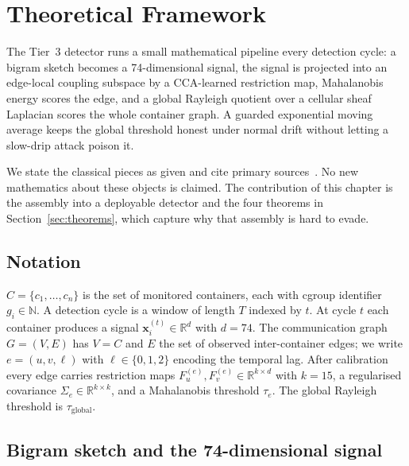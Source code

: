 \chapter{Theoretical Framework}
\label{Chapter3}

The Tier~3 detector runs a small mathematical pipeline every detection
cycle: a bigram sketch becomes a 74-dimensional signal, the signal is
projected into an edge-local coupling subspace by a CCA-learned restriction
map, Mahalanobis energy scores the edge, and a global Rayleigh quotient
over a cellular sheaf Laplacian scores the whole container graph. A guarded
exponential moving average keeps the global threshold honest under normal
drift without letting a slow-drip attack poison it.

We state the classical pieces as given and cite primary
sources~\cite{hotelling1936,mahalanobis1936,hansen2019spectral,curry2014sheaves,robinson2014topological,chung1997spectral}.
No new mathematics about these objects is claimed. The contribution of this
chapter is the assembly into a deployable detector and the four theorems in
Section~\ref{sec:theorems}, which capture why that assembly is hard to
evade.

\section{Notation}
\label{sec:notation}

$C = \{c_1, \ldots, c_n\}$ is the set of monitored containers, each with
cgroup identifier $g_i \in \mathbb{N}$. A detection cycle is a window of
length $T$ indexed by $t$. At cycle $t$ each container produces a signal
$\mathbf{x}_i^{(t)} \in \mathbb{R}^d$ with $d = 74$. The communication graph
$G = (V, E)$ has $V = C$ and $E$ the set of observed inter-container edges;
we write $e = (u, v, \ell)$ with $\ell \in \{0,1,2\}$ encoding the temporal
lag. After calibration every edge carries restriction maps
$F_u^{(e)}, F_v^{(e)} \in \mathbb{R}^{k \times d}$ with $k = 15$, a
regularised covariance $\Sigma_e \in \mathbb{R}^{k \times k}$, and a
Mahalanobis threshold $\tau_e$. The global Rayleigh threshold is
$\tau_{\text{global}}$.

\section{Bigram sketch and the 74-dimensional signal}
\label{sec:signal}

